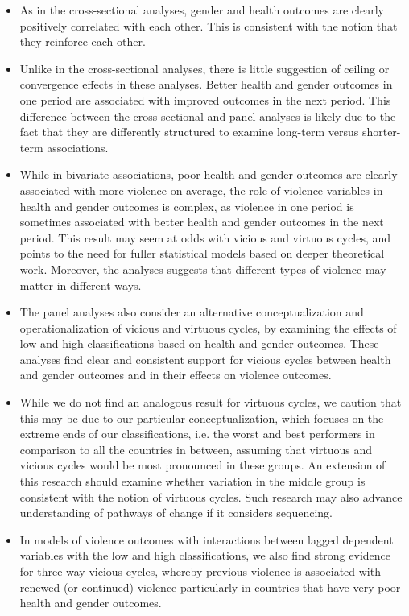 \documentclass[12pt]{article}
\begin{document}
\begin{itemize}
\item As in the cross-sectional analyses, gender and health outcomes are clearly positively correlated with each other. This is consistent with the notion that they reinforce each other.
\item Unlike in the cross-sectional analyses, there is little suggestion of ceiling or convergence effects in these analyses. Better health and gender outcomes in one period are associated with improved outcomes in the next period. This difference between the cross-sectional and panel analyses is likely due to the fact that they are differently structured to examine long-term versus shorter-term associations.
\item While in bivariate associations, poor health and gender outcomes are clearly associated with more violence on average, the role of violence variables in health and gender outcomes is complex, as violence in one period is sometimes associated with better health and gender outcomes in the next period. This result may seem at odds with vicious and virtuous cycles, and points to the need for fuller statistical models based on deeper theoretical work. Moreover, the analyses suggests that different types of violence may matter in different ways.
\item The panel analyses also consider an alternative conceptualization and operationalization of vicious and virtuous cycles, by examining the effects of low and high classifications based on health and gender outcomes. These analyses find clear and consistent support for vicious cycles between health and gender outcomes and in their effects on violence outcomes.
\item While we do not find an analogous result for virtuous cycles, we caution that this may be due to our particular conceptualization, which focuses on the extreme ends of our classifications, i.e. the worst and best performers in comparison to all the countries in between, assuming that virtuous and vicious cycles would be most pronounced in these groups. An extension of this research should examine whether variation in the middle group is consistent with the notion of virtuous cycles. Such research may also advance understanding of pathways of change if it considers sequencing.
\item In models of violence outcomes with interactions between lagged dependent variables with the low and high classifications, we also find strong evidence for three-way vicious cycles, whereby previous violence is associated with renewed (or continued) violence particularly in countries that have very poor health and gender outcomes.
\end{itemize}
\end{document}
